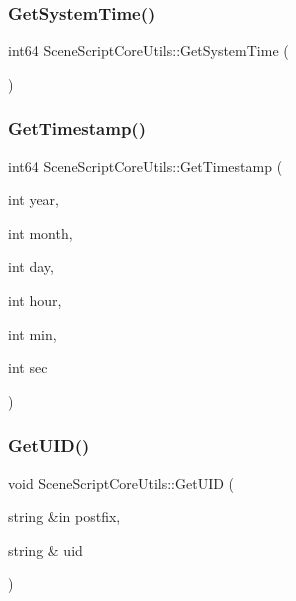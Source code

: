 \hypertarget{class_scene_script_core_utils_ab7c6e31eac5937558ffb14ea657b094e}{}\label{class_scene_script_core_utils_ab7c6e31eac5937558ffb14ea657b094e} 
\subsubsection{\texorpdfstring{Get\+System\+Time()}{GetSystemTime()}}
{\footnotesize\ttfamily int64 Scene\+Script\+Core\+Utils\+::\+Get\+System\+Time (\begin{DoxyParamCaption}{ }\end{DoxyParamCaption})}

\hypertarget{class_scene_script_core_utils_a106ae27358ab3b6cc073665ca13ade2a}{}\label{class_scene_script_core_utils_a106ae27358ab3b6cc073665ca13ade2a} 
\subsubsection{\texorpdfstring{Get\+Timestamp()}{GetTimestamp()}}
{\footnotesize\ttfamily int64 Scene\+Script\+Core\+Utils\+::\+Get\+Timestamp (\begin{DoxyParamCaption}\item[{int}]{year,  }\item[{int}]{month,  }\item[{int}]{day,  }\item[{int}]{hour,  }\item[{int}]{min,  }\item[{int}]{sec }\end{DoxyParamCaption})}

\hypertarget{class_scene_script_core_utils_af5eaaad32fb32c6a6f11a37686e691dd}{}\label{class_scene_script_core_utils_af5eaaad32fb32c6a6f11a37686e691dd} 
\subsubsection{\texorpdfstring{Get\+U\+I\+D()}{GetUID()}}
{\footnotesize\ttfamily void Scene\+Script\+Core\+Utils\+::\+Get\+U\+ID (\begin{DoxyParamCaption}\item[{string \&in}]{postfix,  }\item[{string \&}]{uid }\end{DoxyParamCaption})}

